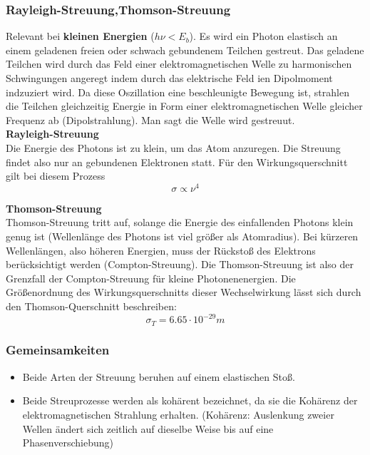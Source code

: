 \documentclass[Ex4_Zusammenfassung.tex]{subfiles}
\begin{document}
\subsubsection*{Rayleigh-Streuung,Thomson-Streuung}
Relevant bei \textbf{kleinen Energien} ($h \nu < E_b $). \newline
Es wird ein Photon elastisch an einem geladenen freien oder schwach gebundenem Teilchen gestreut. Das geladene Teilchen wird durch das Feld einer elektromagnetischen Welle zu harmonischen Schwingungen angeregt indem durch das elektrische Feld ien Dipolmoment indzuziert wird. Da diese Oszillation eine beschleunigte Bewegung ist, strahlen die Teilchen gleichzeitig Energie in Form einer elektromagnetischen Welle gleicher Frequenz ab (Dipolstrahlung). Man sagt die Welle wird gestreuut. \\ \newline
\textbf{Rayleigh-Streuung} \\ \newline 
 Die Energie des Photons ist zu klein, um das Atom anzuregen. Die Streuung findet also nur an gebundenen Elektronen statt. Für den Wirkungsquerschnitt gilt bei diesem Prozess
\begin{equation}
\sigma \propto \nu^4
\end{equation}

\textbf{Thomson-Streuung} \\ \newline
Thomson-Streuung tritt auf, solange die Energie des einfallenden Photons klein genug ist (Wellenlänge des Photons ist viel größer als Atomradius). Bei kürzeren Wellenlängen, also höheren Energien, muss der Rückstoß des Elektrons berücksichtigt werden (Compton-Streuung). Die Thomson-Streuung ist also der Grenzfall der Compton-Streuung für kleine Photonenenergien.  Die Größenordnung des Wirkungsquerschnitts dieser Wechselwirkung lässt sich durch den Thomson-Querschnitt beschreiben:
\begin{equation}
\sigma_{T} = 6.65 \cdot 10^{-29}  m 
\end{equation}

\subsubsection*{Gemeinsamkeiten}
\begin{itemize}
\item Beide Arten der Streuung beruhen auf einem elastischen Stoß.
\item Beide Streuprozesse werden als kohärent bezeichnet, da sie die Kohärenz der elektromagnetischen Strahlung erhalten. \newline  (Kohärenz: Auslenkung zweier Wellen ändert sich zeitlich auf dieselbe Weise bis auf eine Phasenverschiebung)
\end{itemize}
\end{document}
